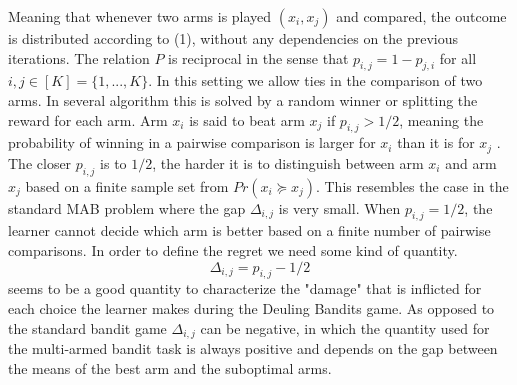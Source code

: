 \documentclass{llncs}
\begin{document}
		Meaning that whenever two arms is played $(x_i ,x_j)$ and compared, the outcome is distributed according to (1), without any dependencies on the previous iterations.
		The relation $P$ is reciprocal in the sense that $p_{i,j} = 1-p_{j,i}$ for all $i, j \in [K] = \{1, . . . , K\}$.  
		In this setting we allow ties in the comparison of two arms.
		In several algorithm this is solved by a random winner or splitting the reward for each arm.		
		Arm $x_i$ is said to beat arm $x_j$ if $p_{i,j} > 1/2$, meaning the probability of winning in a pairwise comparison is larger for $x_i$ than it is for $x_j$ . 
		The closer $p_{i,j}$ is to $1/2$, the harder it is to distinguish between arm $x_i$ and arm $x_j$ based on a finite sample set from $Pr(x_i \succeq x_j)$. This resembles the case in the standard MAB problem where the gap $\Delta_{i,j}$ is very small.
		 When $p_{i,j} = 1/2$, the learner cannot decide which arm is better based on a finite number of pairwise comparisons.
		 In order to define the regret we need some kind of quantity.
		 $$ \Delta_{i,j} = p_{i,j} - 1/2$$
		 seems to be a good quantity to characterize the "damage" that is inflicted for each choice the learner makes during the Deuling Bandits game.
		 As opposed to the standard bandit game 	$\Delta_{i,j}$ can be negative, in which the quantity used for the multi-armed bandit task is always positive and depends on the gap between the means of the best arm and the suboptimal arms.
		 
\end{document}
